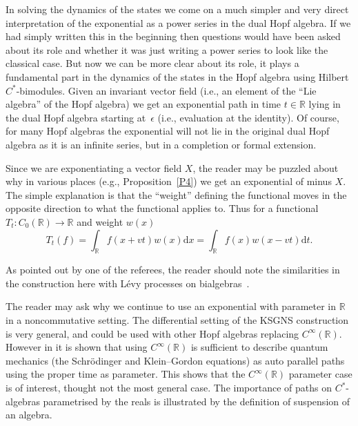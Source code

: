 \documentclass[pdftex]{sigma}
\numberwithin{equation}{section}
\newcommand{\extd}{\mathrm{d}}
\newcommand{\R}{\mathbb{R}}
\newcommand{\<}{\langle}
\renewcommand{\>}{\rangle}
\begin{document}
 In solving the dynamics of the states we come on a much simpler and very direct interpretation of the exponential as a power series in the dual Hopf algebra. If we had simply written this in the beginning then questions would have been asked about its role and whether it was just writing a power series to look like the classical case. But now we can be more clear about its role, it plays a fundamental part in the dynamics of the states in the Hopf algebra using Hilbert $ C^{*} $-bimodules. Given an invariant vector field (i.e., an element of the ``Lie algebra'' of the Hopf algebra) we get an exponential path in time $ t\in \R $ lying in the dual Hopf algebra starting at~$ \epsilon $ (i.e., evaluation at the identity). Of course, for many Hopf algebras the exponential will not lie in the original dual Hopf algebra as it is an infinite series, but in a completion or formal extension.

Since we are exponentiating a vector field $ X $, the reader may be puzzled about why in various places (e.g., Proposition~\ref{P4}) we get an exponential of minus $ X $. The simple explanation is that the ``weight'' defining the functional moves in the opposite direction to what the functional applies to. Thus for a functional $ T_{t}\colon C_{0}(\R) \rightarrow \R $ and weight $ w(x) $
\[T_{t}(f)=\int_{\R} f(x+v t) w(x) \extd x=\int_{\R} f(x) w (x-vt)\extd t. \]

As pointed out by one of the referees, the reader should note the similarities in the construction here with L\'evy processes on bialgebras~\cite{Uwe-Franz}.
		
 The reader may ask why we continue to use an exponential with parameter in $ \R $ in a noncommutative setting. The differential setting of the KSGNS construction is very general, and could be used with other Hopf algebras replacing $C^{\infty}(\R)$. However in \cite{BegMa:geo} it is shown that using $ C^{\infty}(\R) $ is sufficient to describe quantum mechanics (the Schr\"odinger and Klein--Gordon equations) as auto parallel paths using the proper time as parameter. This shows that the $ C^{\infty}(\R) $ parameter case is of interest, thought not the most general case. The importance of paths on $ C^{*} $-algebras parametrised by the reals is illustrated by the definition of suspension of an algebra.
\end{document}
